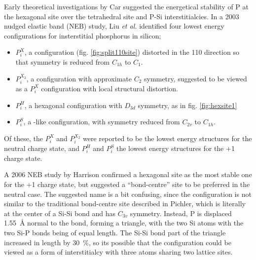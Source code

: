 \documentclass[11pt,bibliography=totoc,index=totoc]{scrbook}   %
\begin{document}
Early theoretical investigations by Car suggested the energetical stability of P at the hexagonal site over the tetrahedral site and P-Si interstitialcies.\cite{Car:1985}
In a 2003 nudged elastic band (NEB) study, Liu \textit{et al.} identified four lowest energy configurations for insterstitial phosphorus in silicon;\cite{Liu:2003}
\begin{itemize}
  \item $P_i^X$, a  configuration (fig. \ref{fig:split110site}) distorted in the 110 direction so that symmetry is reduced from $C_{1h}$ to $C_1$.
  \item $P_i^{X_2}$, a configuration with approximate $C_2$ symmetry, suggested to be viewed as a $P_i^X$ configuration with local structural distortion.
  \item $P_i^H$, a hexagonal configuration with $D_{3d}$ symmetry, as in fig. \ref{fig:hexsite1}
  \item $P_i^S$, a -like configuration, with symmetry reduced from $C_{2v}$ to $C_{1h}$.
\end{itemize}
Of these, the $P_i^X$ and $P_i^{X_2}$ were reported to be the lowest energy structures for the neutral charge state, 
and $P_i^H$ and $P_i^S$ the lowest energy structures for the +1 charge state.\cite{Liu:2003}

A 2006 NEB study by Harrison  confirmed a hexagonal site as the most stable one for the +1 charge state, 
but suggested a ``bond-centre'' site to be preferred in the neutral case.\cite{Harrison:2006}
The suggested name is a bit confusing, since the configuration is not similar to the traditional bond-centre site 
described in Pichler\cite[12]{Pichler:2004}, which is literally at the center of a Si-Si bond and has $C_{3v}$ symmetry.
Instead, P is displaced 1.55~Å normal to the bond, forming a triangle, with the two Si atoms with the two Si-P bonds being of equal length.
The Si-Si bond part of the triangle increased in length by 30~\%, 
so its possible that the configuration could be viewed as a form of interstitialcy with three atoms sharing two lattice sites.



\end{document}
